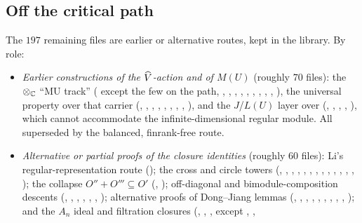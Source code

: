 \subsection{Off the critical path}

The $197$ remaining files are earlier or alternative routes, kept in the library. By role:
\begin{itemize}
\item \emph{Earlier constructions of the $\widehat{V}$-action and of $M(U)$} (roughly $70$ files): the $\otimes_{\mathbb{C}}$ ``MU track''
  ( except the few on the path, , , ,
  , , , , ,
  , ), the universal property over that carrier (,
  , , , , ,
  , , ), and the $J$/$L(U)$ layer over 
  (, , , , ), which cannot
  accommodate the infinite-dimensional regular module. All superseded by the balanced, finrank-free  route.
\item \emph{Alternative or partial proofs of the closure identities} (roughly $60$ files): Li's regular-representation route
  (); the cross and circle towers (, , , ,
  , , , , , ,
  , , , ); the collapse
  $O''+O'''\subseteq O'$ (, ); off-diagonal and bimodule-composition descents
  (, , , , ,
  , ); alternative proofs of Dong--Jiang lemmas (, ,
  , , , , ,
  , , ); and the $A_n$ ideal and filtration closures
  (, , ,  except , ,

\end{itemize}
